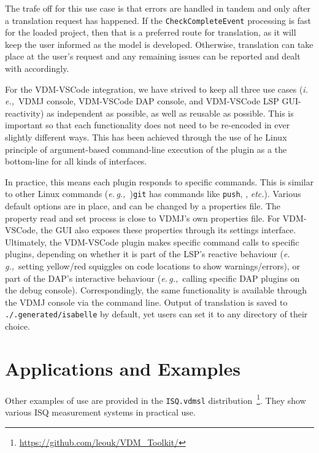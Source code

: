 \documentclass[runningheads,a4paper]{llncs}
\newcommand{\eg}{{\em e.\,g.,\/}}
\newcommand{\ie}{{\em i.\,e.,\/}}
\newcommand{\etc}{{\em etc.\/}}
\begin{document}
The trafe off for this use case is that errors are handled in tandem and only after a translation request has happened. If the \texttt{CheckCompleteEvent} processing is fast for the loaded project, then that is a preferred route for translation, as it will keep the user informed as the model is developed. Otherwise, translation can take place at the user's request and any remaining issues can be reported and dealt with accordingly.  

For the VDM-VSCode integration, we have strived to keep all three use cases (\ie~VDMJ console, VDM-VSCode DAP console, and VDM-VSCode LSP GUI-reactivity) as independent as possible, as well as reusable as possible. This is important so that each functionality does not need to be re-encoded in ever slightly different ways. This has been achieved through the use of he Linux principle of argument-based command-line execution of the plugin as a the bottom-line for all kinds of interfaces. 

In practice, this means each plugin responds to specific commands. This is similar to other Linux commands (\eg~)\texttt{git} has commands like \texttt{push}, , \etc). Various default options are in place, and can be changed by a properties file. The property read and set process is close to VDMJ's own properties file. For VDM-VSCode, the GUI also exposes these properties through its settings interface. Ultimately, the VDM-VSCode plugin makes specific command calls to specific plugins, depending on whether it is part of the LSP's reactive behaviour  (\eg~setting yellow/red squiggles on code locations to show warnings/errors), or part of the DAP's interactive behaviour (\eg~calling specific DAP plugins on the debug console). Correspondingly, the same functionality is available through the VDMJ console via the command line. Output of translation is saved to \texttt{./.generated/isabelle} by default, yet users can set it to any directory of their choice. 

\section{Applications and Examples}\label{sec:Examples}


Other examples of use are provided in the \texttt{ISQ.vdmsl} distribution~\footnote{\url{https://github.com/leouk/VDM_Toolkit/}}. They show various ISQ measurement systems in practical use.

\end{document}

